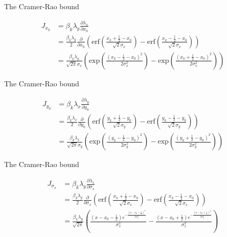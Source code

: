 \documentclass[aspectratio=169]{beamer}
\begin{document}
\begin{frame}{The Cramer-Rao bound}

\begin{align*}
J_{x_{0}} &= \beta_{k}\lambda_{y}\frac{\partial \lambda_{x}}{\partial x_{0}} \\
&= \frac{\beta_{k}\lambda_{y}}{2}\frac{\partial}{\partial x_{0}}\left(\mathrm{erf}\left(\frac{x_{k}+\frac{1}{2}-x_{0}}{\sqrt{2}\sigma_{x}}\right) -\mathrm{erf}\left(\frac{x_{k}-\frac{1}{2}-x_{0}}{\sqrt{2}\sigma_{x}}\right)\right)\\
&= \frac{\beta_{k}\lambda_{y}}{\sqrt{2\pi}\sigma_{x}}\left(\mathrm{exp}\left(\frac{(x_{k}-\frac{1}{2}-x_{0})^{2}}{2\sigma_{x}^{2}}\right) -\mathrm{exp}\left(\frac{(x_{k}+\frac{1}{2}-x_{0})^{2}}{2\sigma_{x}^{2}}\right)\right)
\end{align*}

\end{frame}

\begin{frame}{The Cramer-Rao bound}

\begin{align*}
J_{y_{0}} &= \beta_{k}\lambda_{x}\frac{\partial \lambda_{y}}{\partial y_{0}} \\
&= \frac{\beta_{k}\lambda_{x}}{2}\frac{\partial}{\partial y_{0}}\left(\mathrm{erf}\left(\frac{y_{k}+\frac{1}{2}-y_{0}}{\sqrt{2}\sigma_{y}}\right) -\mathrm{erf}\left(\frac{y_{k}-\frac{1}{2}-y_{0}}{\sqrt{2}\sigma_{y}}\right)\right)\\
&= \frac{\beta_{k}\lambda_{x}}{\sqrt{2\pi}\sigma_{y}}\left(\mathrm{exp}\left(\frac{(y_{k}-\frac{1}{2}-y_{0})^{2}}{2\sigma_{y}^{2}}\right) -\mathrm{exp}\left(\frac{(y_{k}+\frac{1}{2}-y_{0})^{2}}{2\sigma_{y}^{2}}\right)\right)
\end{align*}

\end{frame}

\begin{frame}{The Cramer-Rao bound}

\begin{align*}
J_{\sigma_{x}} &= \beta_{k}\lambda_{y}\frac{\partial \lambda_{x}}{\partial \sigma_{x}} \\
&= \frac{\beta_{k}\lambda_{y}}{2}\frac{\partial}{\partial \sigma_{x}}\left(\mathrm{erf}\left(\frac{x_{k}+\frac{1}{2}-x_{0}}{\sqrt{2}\sigma_{x}}\right) -\mathrm{erf}\left(\frac{x_{k}-\frac{1}{2}-x_{0}}{\sqrt{2}\sigma_{x}}\right)\right)\\
&= \frac{\beta_{k}\lambda_{y}}{\sqrt{2\pi}}\left(\frac{\left(x-x_{0}-\frac{1}{2}\right) e^{-\frac{\left(x-x_{0}-\frac{1}{2}\right)^2}{2 \sigma_{x} ^2}}}{\sigma_{x} ^2}-\frac{ \left(x-x_{0}+\frac{1}{2}\right) e^{-\frac{\left(x-x_{0}+\frac{1}{2}\right)^2}{2 \sigma_{x} ^2}}}{\sigma_{x} ^2}\right)
\end{align*}



\end{frame}
\end{document}
